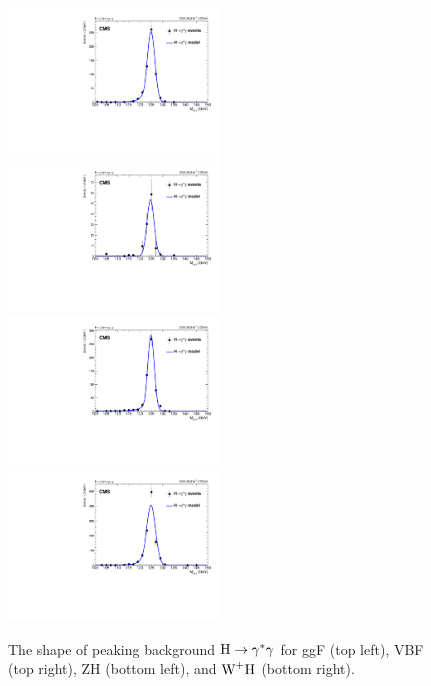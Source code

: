 		\begin{figure}[p]
		    \centering
		    \includegraphics[width=0.5\textwidth]{Fig/Fit/signal/DalitzBkgFit_HJpsiG_ggF_Inclusive}~
		    \includegraphics[width=0.5\textwidth]{Fig/Fit/signal/DalitzBkgFit_HJpsiG_VBF_Inclusive}\\
		    \includegraphics[width=0.5\textwidth]{Fig/Fit/signal/DalitzBkgFit_HJpsiG_ZH_Inclusive}~
		    \includegraphics[width=0.5\textwidth]{Fig/Fit/signal/DalitzBkgFit_HJpsiG_WplusH_Inclusive}\\
		\caption[Signal_hjpsig]{\label{fig:bkghdalitz}
		     The shape of peaking background $\mathrm{H}\to\gamma^{*}\gamma$ for ggF (top left), VBF (top right), ZH (bottom left), and $\text{W}^{+}\mathrm{H}$ (bottom right). }
		\end{figure}
		
